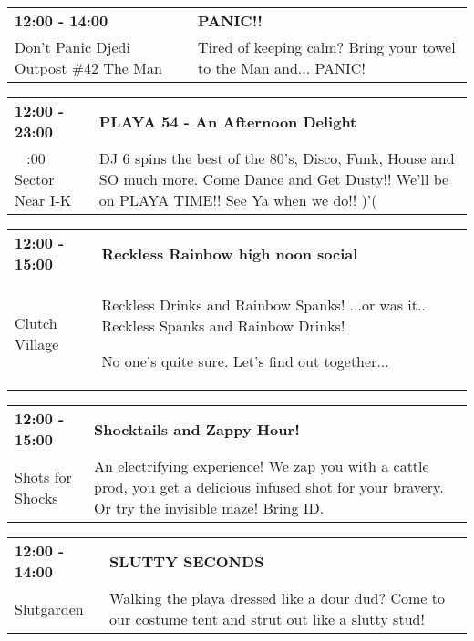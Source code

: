 \begin{tabular}{ p{1in} p{2.2in} }
    \textbf{12:00 - 14:00} & \textbf{PANIC!!} \\
    Don't Panic Djedi Outpost \#42 \newline The Man & Tired of keeping calm? Bring your towel to the Man and... PANIC! \\
    \hline 
\end{tabular}
    
\begin{tabular}{ p{1in} p{2.2in} }
    \textbf{12:00 - 23:00} & \textbf{PLAYA 54 - An Afternoon Delight} \\
    ~ \newline 9:00 Sector Near I-K & DJ 6 spins the best of the 80's, Disco, Funk, House and SO much more. Come Dance and Get Dusty!! We'll be on PLAYA TIME!! See Ya when we do!! )'( \\
    \hline 
\end{tabular}
    
\begin{tabular}{ p{1in} p{2.2in} }
    \textbf{12:00 - 15:00} & \textbf{Reckless Rainbow high noon social} \\
    Clutch Village \newline  & Reckless Drinks and Rainbow Spanks!
...or was it.. Reckless Spanks and Rainbow Drinks!

No one's quite sure. Let's find out together... \\
    \hline 
\end{tabular}
    
\begin{tabular}{ p{1in} p{2.2in} }
    \textbf{12:00 - 15:00} & \textbf{Shocktails and Zappy Hour! } \\
    Shots for Shocks \newline  & An electrifying experience! We zap you with a cattle prod, you get a delicious infused shot for your bravery. Or try the invisible maze! Bring ID. \\
    \hline 
\end{tabular}
    
\begin{tabular}{ p{1in} p{2.2in} }
    \textbf{12:00 - 14:00} & \textbf{SLUTTY SECONDS} \\
    Slutgarden \newline  & Walking the playa dressed like a dour dud? Come to our costume tent and strut out like a slutty stud! \\
    \hline 
\end{tabular}
    
